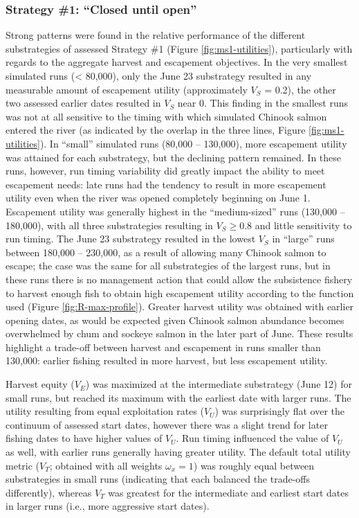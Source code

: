 \documentclass[12pt,]{book}
\theoremstyle{definition}
\theoremstyle{definition}
\theoremstyle{definition}
\theoremstyle{remark}
\begin{document}
\subsubsection{\texorpdfstring{Strategy \#1: ``Closed until
open''}{Strategy \#1: Closed until open}}\label{strategy-1-closed-until-open-1}

\noindent
Strong patterns were found in the relative performance of the different
substrategies of assessed Strategy \#1 (Figure \ref{fig:ms1-utilities}),
particularly with regards to the aggregate harvest and escapement
objectives. In the very smallest simulated runs (\textless{} 80,000),
only the June 23 substrategy resulted in any measurable amount of
escapement utility (approximately \(V_S\) = 0.2), the other two assessed
earlier dates resulted in \(V_S\) near 0. This finding in the smallest
runs was not at all sensitive to the timing with which simulated Chinook
salmon entered the river (as indicated by the overlap in the three
lines, Figure \ref{fig:ms1-utilities}). In ``small'' simulated runs
(80,000 -- 130,000), more escapement utility was attained for each
substrategy, but the declining pattern remained. In these runs, however,
run timing variability did greatly impact the ability to meet escapement
needs: late runs had the tendency to result in more escapement utility
even when the river was opened completely beginning on June 1.
Escapement utility was generally highest in the ``medium-sized'' runs
(130,000 -- 180,000), with all three substrategies resulting in
\(V_S \geq 0.8\) and little sensitivity to run timing. The June 23
substrategy resulted in the lowest \(V_S\) in ``large'' runs between
180,000 -- 230,000, as a result of allowing many Chinook salmon to
escape; the case was the same for all substrategies of the largest runs,
but in these runs there is no management action that could allow the
subsistence fishery to harvest enough fish to obtain high escapement
utility according to the function used (Figure \ref{fig:R-max-profile}).
Greater harvest utility was obtained with earlier opening dates, as
would be expected given Chinook salmon abundance becomes overwhelmed by
chum and sockeye salmon in the later part of June. These results
highlight a trade-off between harvest and escapement in runs smaller
than 130,000: earlier fishing resulted in more harvest, but less
escapement utility.

Harvest equity (\(V_E\)) was maximized at the intermediate substrategy
(June 12) for small runs, but reached its maximum with the earliest date
with larger runs. The utility resulting from equal exploitation rates
(\(V_U\)) was surprisingly flat over the continuum of assessed start
dates, however there was a slight trend for later fishing dates to have
higher values of \(V_U\). Run timing influenced the value of \(V_U\) as
well, with earlier runs generally having greater utility. The default
total utility metric (\(V_T\); obtained with all weights
\(\omega_x = 1\)) was roughly equal between substrategies in small runs
(indicating that each balanced the trade-offs differently), whereas
\(V_T\) was greatest for the intermediate and earliest start dates in
larger runs (i.e., more aggressive start dates).
\end{document}
